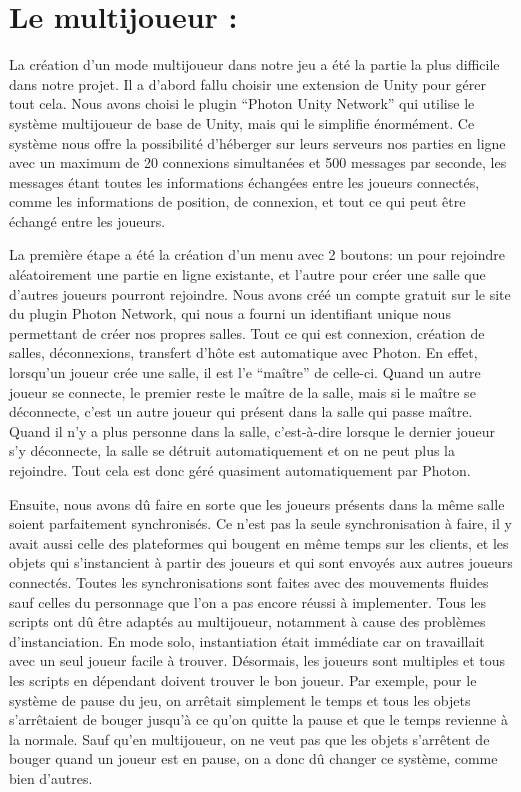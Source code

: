\documentclass{article}
\begin{document}
\newpage

\section{Le multijoueur :}

\quad

    La création d’un mode multijoueur dans notre jeu a été la partie la plus difficile dans notre projet. Il a d’abord fallu choisir une extension de Unity pour gérer tout cela. Nous avons choisi le plugin “Photon Unity Network” qui utilise le système multijoueur de base de Unity, mais qui le simplifie énormément. Ce système nous offre la possibilité d’héberger sur leurs serveurs nos parties en ligne avec un maximum de 20 connexions simultanées et 500 messages par seconde, les messages étant toutes les informations échangées entre les joueurs connectés, comme les informations de position, de connexion, et tout ce qui peut être échangé entre les joueurs. 

    La première étape a été la création d’un menu avec 2 boutons: un pour rejoindre aléatoirement une partie en ligne existante, et l’autre pour créer une salle que d’autres joueurs pourront rejoindre. Nous avons créé un compte gratuit sur le site du plugin Photon Network, qui nous a fourni un identifiant unique nous permettant de créer nos propres salles. Tout ce qui est connexion, création de salles, déconnexions, transfert d’hôte est automatique avec Photon. En effet, lorsqu’un joueur crée une salle, il est l’e “maître” de celle-ci. Quand un autre joueur se connecte, le premier reste le maître de la salle, mais si le maître se déconnecte, c’est un autre joueur qui présent dans la salle qui  passe maître. Quand il n’y a plus personne dans la salle, c’est-à-dire lorsque le dernier joueur s’y déconnecte, la salle se détruit automatiquement et on ne peut plus la rejoindre. Tout cela est donc géré quasiment automatiquement par Photon.

    Ensuite, nous avons dû faire en sorte que les joueurs présents dans la même salle soient parfaitement synchronisés. Ce n’est pas la seule synchronisation à faire, il y avait aussi celle des plateformes qui bougent en même temps sur les clients, et les objets qui s’instancient à partir des joueurs et qui sont envoyés aux autres joueurs connectés. Toutes les synchronisations sont faites avec des mouvements fluides sauf celles du personnage que l’on a pas encore réussi à implementer. Tous les scripts ont dû être adaptés au multijoueur, notamment à cause des problèmes d’instanciation. En mode solo, instantiation était immédiate car on travaillait avec un seul joueur facile à trouver. Désormais, les joueurs sont multiples et tous les scripts en dépendant doivent trouver le bon joueur. Par exemple, pour le système de pause du jeu, on arrêtait simplement le temps et tous les objets s’arrêtaient de bouger jusqu’à ce qu’on quitte la pause et que le temps revienne à la normale. Sauf qu’en multijoueur, on ne veut pas que les objets s’arrêtent de bouger quand un joueur est en pause, on a donc dû changer ce système, comme bien d’autres.
\end{document}

